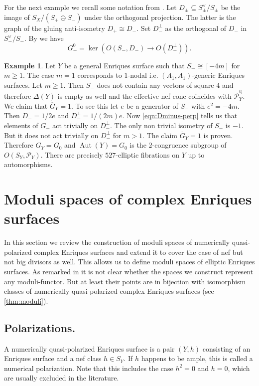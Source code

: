\documentclass{amsart}
\theoremstyle{definition}
\newtheorem{example}[definition]{Example}
\theoremstyle{plain}
\DeclareMathOperator{\Aut}{Aut}
\renewcommand{\P}{\mathcal{P}}
\newcommand{\Gbar}{\overline{G}}
\newcommand{\Pbar}{\overline{\P}^\mathbb{Q}}
\begin{document}
For the next example we recall some notation from \cite[Section 3]{brandhorst_shimada:tautaubar}.
Let $D_\pm \subseteq S^\vee_\pm/S_\pm$
be the image of $S_X/(S_+
\oplus S_-)$ under the orthogonal projection.
The latter is the graph of the gluing anti-isometry $D_+ \cong D_-$. Set $D_-^\perp$ as the orthogonal of $D_-$ in $S_-^\vee/S_-$.
By \cite[Theorem 3.4]{brandhorst_shimada:tautaubar} we have
\begin{equation}\label{eqn:Dminus-perp}
    G_-^0 = \ker \left(O(S_-,D_-) \to O(D_-^\perp)\right).
\end{equation}
\begin{example}
Let $Y$ be a general Enriques surface such that $S_- \cong [-4m]$ for $m \geq 1$.
The case $m=1$ corresponds to $1$-nodal i.e. $(A_1,A_1)$-generic Enriques surfaces.
Let $m \geq 1$. Then $S_-$ does not contain any vectors of square $4$ and therefore  \(\Delta(Y)\) is empty as well and the effective nef cone coincides with $\Pbar_Y$. We claim that $\Gbar_Y = 1$.
To see this let $e$ be a generator of $S_-$ with $e^2 = -4m$. Then $D_- = 1/2 e$ and $D_-^\perp = 1/(2m) e$.
Now \cref{eqn:Dminus-perp} tells us that
elements of \(G_-\) act trivially on \(D_-^\perp\).
The only non trivial isometry of $S_-$ is $-1$.
But it does not act trivially on $D_-^\perp$ for $m>1$.
The claim $\Gbar_Y =1$ is proven.
Therefore $G_Y =G_0$ and $\Aut(Y) = G_0$ is the $2$-congruence subgroup of $O(S_Y,\P_Y)$.
There are precisely $527$-elliptic fibrations on $Y$ up to automorphisms.
\end{example}



\section{Moduli spaces of complex Enriques surfaces} \label{sect:moduli-general}
In this section we review the construction of moduli spaces of numerically quasi-polarized complex Enriques surfaces \cite{gritsenko-hulek} and extend it to cover the case of nef but not big divisors as well. This allows us to define moduli spaces of elliptic Enriques surfaces. As remarked in \cite[Remark 2.2]{gritsenko-hulek} it is not clear whether the spaces we construct represent any moduli-functor. But at least their points are in bijection with isomorphism classes of numerically quasi-polarized complex Enriques surfaces (see \cref{thm:moduli}).
\subsection*{Polarizations.}
A numerically quasi-polarized Enriques surface is a pair $(Y,h)$ consisting of an Enriques surface and a nef class $h \in S_Y$.
If $h$ happens to be ample, this is called a numerical polarization.
Note that this includes the case $h^2=0$ and $h=0$, which are usually excluded in the literature.
\end{document}
